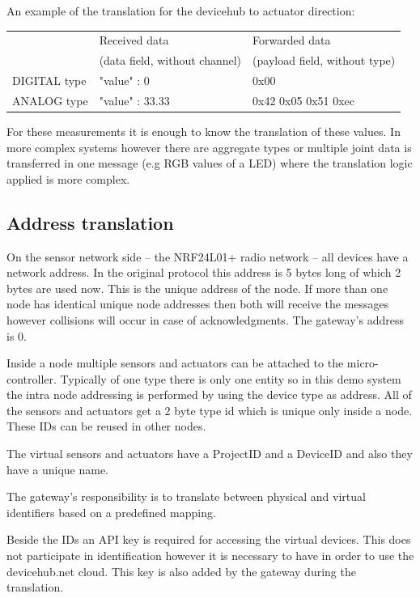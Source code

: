 \documentclass[a4paper]{article}
\begin{document}
An example of the translation for the devicehub to actuator direction:

\begin{tabular}{|l|l|l|}
\hline
 & Received data  & Forwarded data  \\
 & (data field, without channel) & (payload field, without type)  \\
 \hline
DIGITAL type & {"value" : 0} & 0x00  \\
\hline
ANALOG type & {"value" : 33.33} & 0x42 0x05 0x51 0xec \\
\hline
\end{tabular}

For these measurements it is enough to know the translation of these values. In more complex
systems however there are aggregate types or multiple joint data is transferred in one message 
(e.g RGB values of a LED) where the translation logic applied is more complex. 


\subsection{Address translation}

On the sensor network side -- the NRF24L01+ radio network -- all devices have a network address.
In the original protocol this address is 5 bytes long of which 2 bytes are used now. This is
the unique address of the node. If more than one node has identical unique node addresses
then both will receive the messages however collisions will occur in case of acknowledgments.
The gateway's address is 0.

Inside a node multiple sensors and actuators can be attached to the micro-controller. Typically 
of one type there is only one entity so in this demo system the intra node addressing is performed by using
the device type as address. All of the sensors and actuators get a 2 byte type id which is unique only
inside a node. These IDs can be reused in other nodes.

The virtual sensors and actuators have a ProjectID and a DeviceID and also they have a 
unique name.

The gateway's responsibility is to translate between physical and virtual identifiers
based on a predefined mapping.

Beside the IDs an API key is required for accessing the virtual devices. This does not 
participate in identification however it is necessary to have in order to use the devicehub.net
cloud. This key is also added by the gateway during the translation.
\end{document}
